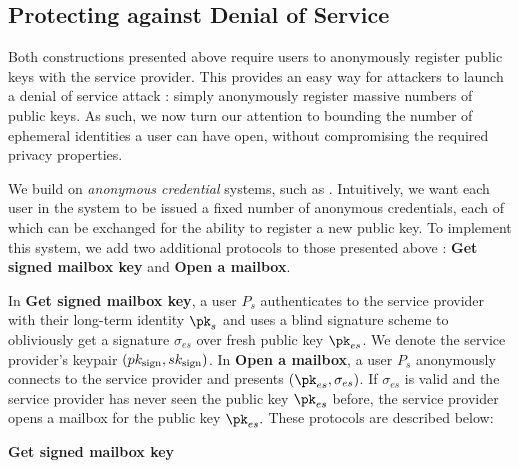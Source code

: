\subsection{Protecting against Denial of Service}\label{sec:signal-levelthreesolution}

Both constructions presented above require users to anonymously register
public keys with the service provider.  This provides an easy way for
attackers to launch a denial of service attack%
: simply anonymously register massive numbers of public keys.
As such, we now turn our attention to bounding the number of ephemeral identities a user can have open, without compromising the required privacy properties.

We build on {\em anonymous credential} systems, such as \cite{C:Chaum82}.  Intuitively, we want each user in the system to be issued a fixed number of anonymous credentials, each of which can be exchanged for the ability to register a new public key. To implement this system, we add two additional protocols to those presented above%
: {\bf Get signed mailbox key} and {\bf Open a mailbox}.

In {\bf Get signed mailbox key}, a user $P_s$ authenticates to the service provider with their long-term identity $\pk_s$ and uses a blind signature scheme to obliviously get a signature $\sigma_{es}$ over fresh public key $\pk_{es}$.  We denote the service provider's keypair $(pk_{\text{sign}}, sk_{\text{sign}})$.  In {\bf Open a mailbox}, a user $P_s$ anonymously connects to the service provider and presents $(\pk_{es}, \sigma_{es})$.  If $\sigma_{es}$ is valid and the service provider has never seen the public key $\pk_{es}$ before, the service provider opens a mailbox for the public key $\pk_{es}.$  These protocols are described below:

\medskip \noindent
\textbf{Get signed mailbox key}

